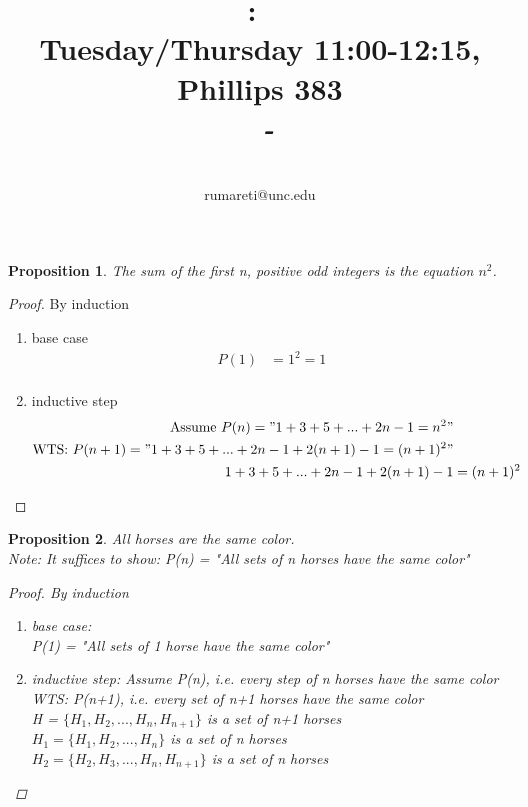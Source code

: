 \documentclass{article}
\title{
    \vspace{2in}
    \textmd{\textbf{\hmwkClass:\ \hmwkTitle}}\\
    \normalsize\vspace{0.1in}\small{Tuesday/Thursday 11:00-12:15, Phillips 383}\\
    \vspace{0.1in}\large{\textit{\hmwkClassInstructor\ - \hmwkClassTime}}
    \vspace{3in}
}
\author{\hmwkAuthorName\\\small{rumareti@unc.edu}}
\date{}
\newtheorem{proposition}{Proposition}
\begin{document}
\maketitle

\pagebreak

\begin{proposition}
    The sum of the first n, positive odd integers is the equation \(n^2\).
\end{proposition} 

\begin{proof}
    By induction
    \begin{enumerate}
        \item base case
        \begin{align*}
            P(1) &= 1^2 = 1\\
        \end{align*}
        \item inductive step
        \begin{align*}
            \text{Assume } P(n) = "1+3+5+...+2n-1 = n^2"\\
            \text{WTS: } P(n+1) = "1+3+5+...+2n-1+2(n+1)-1 = (n+1)^2"\\
            1+3+5+...+2n-1+2(n+1)-1 &= (n+1)^2\\
        \end{align*}
    \end{enumerate}
\end{proof}
\begin{proposition} All horses are the same color.\\
\emph{Note:} It suffices to show: P(n) = "All sets of n horses have the same color"\\
\begin{proof}
    By induction
    \begin{enumerate}
        \item base case:\\
        P(1) = "All sets of 1 horse have the same color"\\
        \item inductive step: Assume P(n), i.e. every step of n horses have the same color\\
        WTS: P(n+1), i.e. every set of n+1 horses have the same color\\
        H = \(\{H_1, H_2, ..., H_n,H_{n+1}\}\) is a set of n+1 horses\\
        \(H_1 = \{H_1, H_2, ..., H_n\}\) is a set of n horses\\
        \(H_2 = \{H_2, H_3, ..., H_n,H_{n+1}\}\) is a set of n horses\\
    \end{enumerate}
\end{proof}
\end{proposition}
\end{document}
